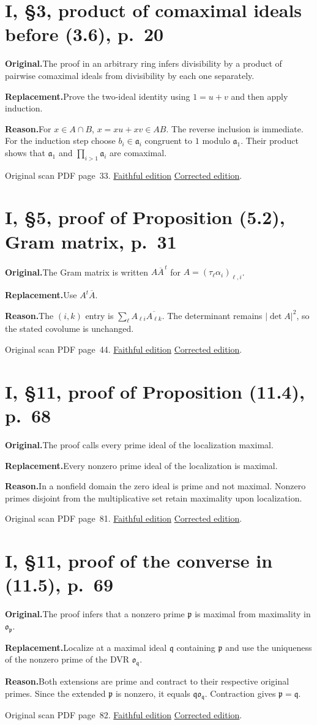 \documentclass[11pt,a4paper]{article}
\newcommand{\original}{\par\smallskip\noindent\textbf{Original.}\enspace}
\newcommand{\replacement}{\par\smallskip\noindent\textbf{Replacement.}\enspace}
\newcommand{\reason}{\par\smallskip\noindent\textbf{Reason.}\enspace}
\newcommand{\editionlink}[3]{\href{#1\#errata.#2}{#3}}
\newcommand{\location}[2]{%
  \par\smallskip\noindent Original scan PDF page~#2.\enspace
  \editionlink{Neukirch_Faithful.pdf}{#1}{Faithful edition}
  \quad\editionlink{Neukirch_Corrected.pdf}{#1}{Corrected edition}.}
\begin{document}
\setcounter{section}{46}
\section{I, \S3, product of comaximal ideals before (3.6), p.~20}\label{errata:item:47}

\original The proof in an arbitrary ring infers divisibility by a product of pairwise comaximal ideals from divisibility by each one separately.
\replacement Prove the two-ideal identity using $1=u+v$ and then apply induction.
\reason For $x\in A\cap B$, $x=xu+xv\in AB$. The reverse inclusion is immediate. For the induction step choose $b_i\in\mathfrak a_i$ congruent to $1$ modulo $\mathfrak a_1$. Their product shows that $\mathfrak a_1$ and $\prod_{i>1}\mathfrak a_i$ are comaximal.
\location{47}{33}

\setcounter{section}{47}
\section{I, \S5, proof of Proposition (5.2), Gram matrix, p.~31}\label{errata:item:48}

\original The Gram matrix is written $A\overline A^{\,t}$ for $A=(\tau_\ell\alpha_i)_{\ell,i}$.
\replacement Use $A^t\overline A$.
\reason The $(i,k)$ entry is $\sum_\ell A_{\ell i}\overline{A_{\ell k}}$. The determinant remains $|\det A|^2$, so the stated covolume is unchanged.
\location{48}{44}

\setcounter{section}{48}
\section{I, \S11, proof of Proposition (11.4), p.~68}\label{errata:item:49}

\original The proof calls every prime ideal of the localization maximal.
\replacement Every nonzero prime ideal of the localization is maximal.
\reason In a nonfield domain the zero ideal is prime and not maximal. Nonzero primes disjoint from the multiplicative set retain maximality upon localization.
\location{49}{81}

\setcounter{section}{49}
\section{I, \S11, proof of the converse in (11.5), p.~69}\label{errata:item:50}

\original The proof infers that a nonzero prime $\mathfrak p$ is maximal from maximality in $\mathfrak o_{\mathfrak p}$.
\replacement Localize at a maximal ideal $\mathfrak q$ containing $\mathfrak p$ and use the uniqueness of the nonzero prime of the DVR $\mathfrak o_{\mathfrak q}$.
\reason Both extensions are prime and contract to their respective original primes. Since the extended $\mathfrak p$ is nonzero, it equals $\mathfrak q\mathfrak o_{\mathfrak q}$. Contraction gives $\mathfrak p=\mathfrak q$.
\location{50}{82}
\end{document}
